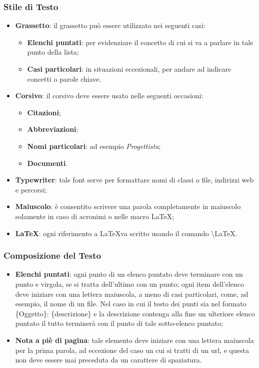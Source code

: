 \subsubsection{Stile di Testo}
\begin{itemize}
\item \textbf{Grassetto}: il grassetto può essere utilizzato nei seguenti casi:
\begin{itemize}
\item \textbf{Elenchi puntati}: per evidenziare il concetto di cui si va a parlare in tale punto della lista;
\item \textbf{Casi particolari}: in situazioni eccezionali, per andare ad indicare concetti o parole chiave.
\end{itemize}
\item \textbf{Corsivo}: il corsivo deve essere usato nelle seguenti occasioni:
\begin{itemize}
\item \textbf{Citazioni};
\item \textbf{Abbreviazioni};
\item \textbf{Nomi particolari}: ad esempio \textit{Progettista};
\item \textbf{Documenti}.
\end{itemize}
\item \textbf{Typewriter}: tale font serve per formattare nomi di classi o file, indirizzi web e percorsi;
\item \textbf{Maiuscolo}: è consentito scrivere una parola completamente in maiuscolo solamente in caso di acronimi o nelle macro \LaTeX;
\item \textbf{\LaTeX}: ogni riferimento a \LaTeX va scritto usando il comando \textbackslash{LaTeX}.
\end{itemize}

\subsubsection{Composizione del Testo}
\begin{itemize}
\item \textbf{Elenchi puntati}: ogni punto di un elenco puntato deve terminare con un punto e virgola, se si tratta dell'ultimo con un punto; ogni item dell'elenco deve iniziare con una lettera maiuscola, a meno di casi particolari, come, ad esempio, il nome di un file. Nel caso in cui il testo dei punti sia nel formato \{Oggetto\}: \{descrizione\} e la descrizione contenga alla fine un ulteriore elenco puntato il tutto terminerà con il punto di tale sotto-elenco puntato;
\item \textbf{Nota a piè di pagina}: tale elemento deve iniziare con una lettera maiuscola per la prima parola, ad eccezione del caso un cui si tratti di un url, e questa non deve essere mai preceduta da un carattere di spaziatura. 
\end{itemize}

